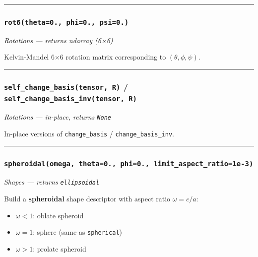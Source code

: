 \documentclass[
  a4paper,
  numbers=noendperiod,
  DIV=12]{scrreprt}
\providecommand{\tightlist}{%
  \setlength{\itemsep}{0pt}\setlength{\parskip}{0pt}}
\begin{document}
\begin{center}\rule{0.5\linewidth}{0.5pt}\end{center}

\subsubsection{\texorpdfstring{\texttt{rot6(theta=0.,\ phi=0.,\ psi=0.)}}{rot6(theta=0., phi=0., psi=0.)}}\label{api-rot6}

\emph{Rotations --- returns ndarray (6×6)}

Kelvin-Mandel 6×6 rotation matrix corresponding to
\((\theta,\phi,\psi)\).

\begin{center}\rule{0.5\linewidth}{0.5pt}\end{center}

\subsubsection{\texorpdfstring{\texttt{self\_change\_basis(tensor,\ R)}
/
\texttt{self\_change\_basis\_inv(tensor,\ R)}}{self\_change\_basis(tensor, R) / self\_change\_basis\_inv(tensor, R)}}\label{api-self-change-basis}

\emph{Rotations --- in-place, returns \texttt{None}}

In-place versions of \texttt{change\_basis} /
\texttt{change\_basis\_inv}.

\begin{center}\rule{0.5\linewidth}{0.5pt}\end{center}

\subsubsection{\texorpdfstring{\texttt{spheroidal(omega,\ theta=0.,\ phi=0.,\ limit\_aspect\_ratio=1e-3)}}{spheroidal(omega, theta=0., phi=0., limit\_aspect\_ratio=1e-3)}}\label{api-spheroidal}

\emph{Shapes --- returns \texttt{ellipsoidal}}

Build a \textbf{spheroidal} shape descriptor with aspect ratio
\(\omega = c/a\):

\begin{itemize}
\tightlist
\item
  \(\omega < 1\): oblate spheroid
\item
  \(\omega = 1\): sphere (same as \texttt{spherical})
\item
  \(\omega > 1\): prolate spheroid
\end{itemize}
\end{document}
